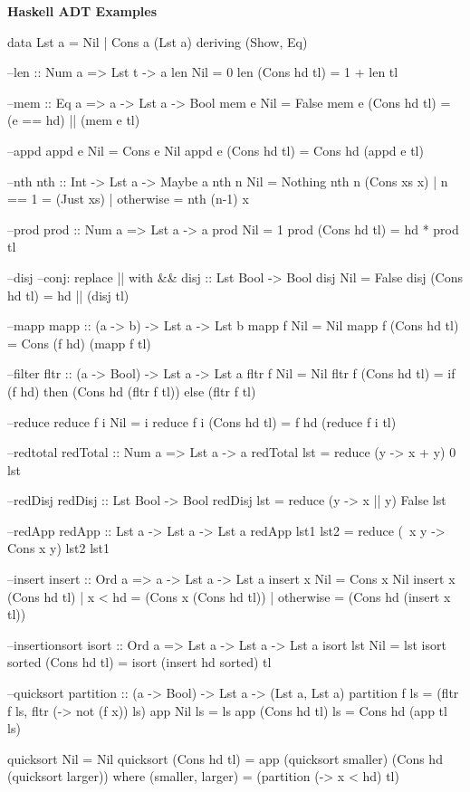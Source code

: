 \begin{breakbox}
\textbf{Haskell ADT Examples}
\begin{haskellcode}
data Lst a = Nil | Cons a (Lst a) deriving (Show, Eq)

--len :: Num a => Lst t -> a
len Nil = 0
len (Cons hd tl) = 1 + len tl

--mem :: Eq a => a -> Lst a -> Bool
mem e Nil = False
mem e (Cons hd tl) = (e == hd) || (mem e tl)

--appd
appd e Nil = Cons e Nil
appd e (Cons hd tl) = Cons hd (appd e tl)

--nth
nth :: Int -> Lst a -> Maybe a
nth n Nil = Nothing
nth n (Cons xs x) | n == 1 = (Just xs)
                  | otherwise = nth (n-1) x

--prod
prod :: Num a => Lst a -> a
prod Nil = 1
prod (Cons hd tl) = hd * prod tl

--disj --conj: replace || with &&
disj :: Lst Bool -> Bool
disj Nil = False
disj (Cons hd tl) = hd || (disj tl)

--mapp
mapp :: (a -> b) -> Lst a -> Lst b
mapp f Nil = Nil
mapp f (Cons hd tl) = Cons (f hd) (mapp f tl)

--filter
fltr :: (a -> Bool) -> Lst a -> Lst a
fltr f Nil = Nil
fltr f (Cons hd tl) = if (f hd) then 
			(Cons hd (fltr f tl)) else (fltr f tl)

--reduce 
reduce f i Nil = i
reduce f i (Cons hd tl) = f hd (reduce f i tl)

--redtotal
redTotal :: Num a => Lst a -> a
redTotal lst = reduce (\x y -> x + y) 0 lst

--redDisj
redDisj :: Lst Bool -> Bool
redDisj lst = reduce (\x y -> x || y) False lst

--redApp
redApp :: Lst a -> Lst a -> Lst a
redApp lst1 lst2 = reduce (\ x y -> Cons x y) lst2 lst1

--insert
insert :: Ord a => a -> Lst a -> Lst a
insert x Nil = Cons x Nil
insert x (Cons hd tl) | x < hd = (Cons x (Cons hd tl))
                      | otherwise = (Cons hd (insert x tl))

--insertionsort
isort :: Ord a => Lst a -> Lst a -> Lst a
isort lst Nil = lst
isort sorted (Cons hd tl) = isort (insert hd sorted) tl

--quicksort
partition :: (a -> Bool) -> Lst a -> (Lst a, Lst a)
partition f ls = (fltr f ls, fltr (\x -> not (f x)) ls)
app Nil ls = ls
app (Cons hd tl) ls = Cons hd (app tl ls)

quicksort Nil = Nil
quicksort (Cons hd tl) = app (quicksort smaller) 
			(Cons hd (quicksort larger))
  where
    (smaller, larger) = (partition (\x -> x < hd) tl)
\end{haskellcode}
\end{breakbox}


